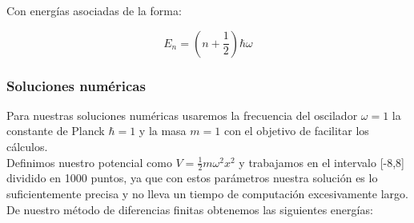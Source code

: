 \documentclass[12pt]{article}
\begin{document}
    Con energías asociadas de la forma:
    
    \begin{equation}
        \boxed{E_n=\left(n+\frac{1}{2}\right)\hbar \omega }
    \end{equation}


    \subsubsection{Soluciones numéricas}
    
    Para nuestras soluciones numéricas usaremos la frecuencia del oscilador $\omega=1$ la constante de Planck $\hbar=1$ y la masa $m=1$ con el objetivo de facilitar los cálculos.\\
    
    Definimos nuestro potencial como $V=\frac{1}{2}m\omega^2x^2$ y trabajamos en el intervalo [-8,8] dividido en 1000 puntos, ya que con estos parámetros nuestra solución es lo suficientemente precisa y no lleva un tiempo de computación excesivamente largo.\\
    
    De nuestro método de diferencias finitas obtenemos las siguientes energías:\\
    
\end{document}

